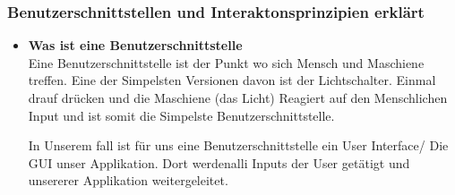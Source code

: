 \documentclass[10pt]{article}
\begin{document}
	\subsubsection [Benuzterschnitstellen und Interaktonsprinzipien erkläret] {Benutzerschnittstellen und Interaktonsprinzipien erklärt}
	\begin{itemize}
		\item \textbf{Was ist eine Benutzerschnittstelle}
		\\ Eine Benutzerschnittstelle ist der Punkt wo sich Mensch und Maschiene treffen. Eine der Simpelsten Versionen davon ist der Lichtschalter. Einmal drauf drücken und die Maschiene (das Licht) Reagiert auf den Menschlichen Input und ist somit die Simpelste Benutzerschnittstelle.
		
		In Unserem fall ist für uns eine Benutzerschnittstelle ein User Interface/ Die GUI unser Applikation. Dort werdenalli Inputs der User getätigt und unsererer Applikation weitergeleitet.
		

\end{itemize}
\end{document}
